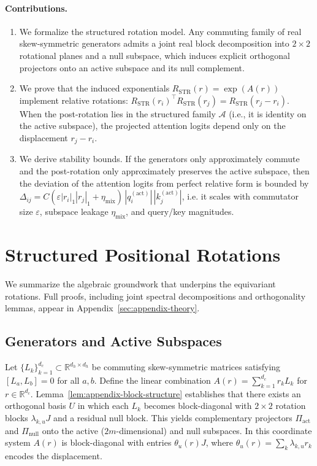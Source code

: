 \documentclass[11pt]{article}
\newcommand{\Real}{\mathbb{R}}
\begin{document}
\paragraph{Contributions.}
\begin{enumerate}[leftmargin=1.5em]
  \item We formalize the structured rotation model. Any commuting family of real skew-symmetric generators admits a joint real block decomposition into $2\times 2$ rotational planes and a null subspace, which induces explicit orthogonal projectors onto an active subspace and its null complement.
  \item We prove that the induced exponentials $R_{\mathrm{STR}}(r) = \exp(A(r))$ implement relative rotations: $R_{\mathrm{STR}}(r_i)^\top R_{\mathrm{STR}}(r_j) = R_{\mathrm{STR}}(r_j - r_i)$. When the post-rotation lies in the structured family $\mathcal{A}$ (i.e., it is identity on the active subspace), the projected attention logits depend only on the displacement $r_j - r_i$.
  \item We derive stability bounds. If the generators only approximately commute and the post-rotation only approximately preserves the active subspace, then the deviation of the attention logits from perfect relative form is bounded by $\Delta_{ij} = C(\varepsilon |r_i|_1 |r_j|_1 + \eta_{\mathrm{mix}})\,|q_i^{(\mathrm{act})}|\,|k_j^{(\mathrm{act})}|$, i.e. it scales with commutator size $\varepsilon$, subspace leakage $\eta_{\mathrm{mix}}$, and query/key magnitudes.
\end{enumerate}

\section{Structured Positional Rotations}
\label{sec:structured-rotations}

We summarize the algebraic groundwork that underpins the equivariant rotations. Full proofs,
including joint spectral decompositions and orthogonality lemmas, appear in Appendix~\ref{sec:appendix-theory}.

\subsection{Generators and Active Subspaces}

Let $\{L_k\}_{k=1}^{d_c} \subset \Real^{d_h \times d_h}$ be commuting skew-symmetric matrices satisfying
$[L_a,L_b] = 0$ for all $a,b$. Define the linear combination $A(r) = \sum_{k=1}^{d_c} r_k L_k$ for
$r \in \Real^{d_c}$. Lemma~\ref{lem:appendix-block-structure} establishes that there exists an orthogonal basis $U$ in which each
$L_k$ becomes block-diagonal with $2\times 2$ rotation blocks $\lambda_{k,u} J$ and a residual null
block. This yields complementary projectors $\Pi_{\mathrm{act}}$ and $\Pi_{\mathrm{null}}$ onto the active
($2m$-dimensional) and null subspaces. In this coordinate system $A(r)$ is block-diagonal with
entries $\theta_u(r) J$, where $\theta_u(r) = \sum_k \lambda_{k,u} r_k$ encodes the displacement.
\end{document}
